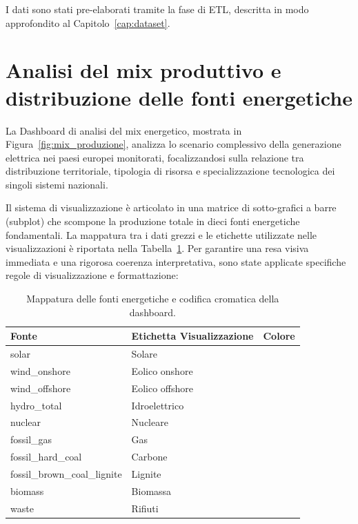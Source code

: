 I dati sono stati pre-elaborati tramite la fase di ETL, descritta in modo approfondito al Capitolo~\ref{cap:dataset}.

\newpage

\section{Analisi del mix produttivo e distribuzione delle fonti energetiche}

La Dashboard di analisi del mix energetico, mostrata in Figura~\ref{fig:mix_produzione}, analizza lo scenario complessivo della generazione elettrica nei paesi europei monitorati, focalizzandosi sulla relazione tra distribuzione territoriale, tipologia di risorsa e specializzazione tecnologica dei singoli sistemi nazionali. 

Il sistema di visualizzazione è articolato in una matrice di sotto-grafici a barre (subplot) che scompone la produzione totale in dieci fonti energetiche fondamentali. La mappatura tra i dati grezzi e le etichette utilizzate nelle visualizzazioni è riportata nella Tabella~\ref{tab:fonti_energia}. Per garantire una resa visiva immediata e una rigorosa coerenza interpretativa, sono state applicate specifiche regole di visualizzazione e formattazione:

\begin{table}[htbp]
    \centering
    \begin{tabular}{|l|l|l|}
        \hline
        \rowcolor[gray]{0.9} \textbf{Fonte} & \textbf{Etichetta Visualizzazione} & \textbf{Colore} \\ \hline
        solar & Solare & \raisebox{-0.2em}{\textcolor[HTML]{F2B705}{\rule{1em}{1em}}} \\
        wind\_onshore & Eolico onshore & \raisebox{-0.2em}{\textcolor[HTML]{4C9BE8}{\rule{1em}{1em}}} \\
        wind\_offshore & Eolico offshore & \raisebox{-0.2em}{\textcolor[HTML]{1B5E9E}{\rule{1em}{1em}}} \\
        hydro\_total & Idroelettrico & \raisebox{-0.2em}{\textcolor[HTML]{2BB3A3}{\rule{1em}{1em}}} \\
        nuclear & Nucleare & \raisebox{-0.2em}{\textcolor[HTML]{8E5BD1}{\rule{1em}{1em}}} \\
        fossil\_gas & Gas & \raisebox{-0.2em}{\textcolor[HTML]{E8743B}{\rule{1em}{1em}}} \\
        fossil\_hard\_coal & Carbone & \raisebox{-0.2em}{\textcolor[HTML]{4A4A4A}{\rule{1em}{1em}}} \\
        fossil\_brown\_coal\_lignite & Lignite & \raisebox{-0.2em}{\textcolor[HTML]{8B5A2B}{\rule{1em}{1em}}} \\
        biomass & Biomassa & \raisebox{-0.2em}{\textcolor[HTML]{6BAA3C}{\rule{1em}{1em}}} \\
        waste & Rifiuti & \raisebox{-0.2em}{\textcolor[HTML]{A9A9A9}{\rule{1em}{1em}}} \\
        \hline
    \end{tabular}
    \caption{Mappatura delle fonti energetiche e codifica cromatica della dashboard.}
    \label{tab:fonti_energia}
\end{table}

